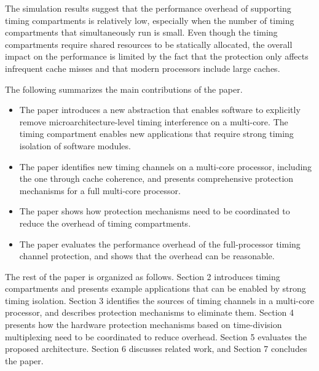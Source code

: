 
The simulation results suggest that the performance overhead of supporting
timing compartments is relatively low, especially when the number of timing
compartments that simultaneously run is small.
Even though
the timing compartments require shared resources to be statically 
allocated, the overall impact on the performance is limited by the fact
that the protection only affects infrequent cache misses and that modern
processors include large caches. 

The following summarizes the main contributions of the paper.

\begin{itemize}
\item The paper introduces a new abstraction that enables software to
explicitly remove microarchitecture-level timing interference on a multi-core.
The timing compartment enables new
applications that require strong timing isolation of software modules.
\item The paper identifies new timing channels on a multi-core processor,
including the one through cache coherence, and presents
comprehensive protection mechanisms for a full multi-core processor.
\item The paper shows how protection mechanisms need to be coordinated to
reduce the overhead of timing compartments.
\item The paper evaluates the performance overhead of the full-processor
timing channel protection, and shows that the overhead can be reasonable.
\end{itemize}

The rest of the paper is organized as follows.
Section 2 introduces timing compartments and 
presents example applications that can be enabled by strong timing isolation.
Section 3 identifies the sources of timing channels in a multi-core processor, and
describes protection mechanisms to eliminate them. 
Section 4 presents how the hardware protection mechanisms based on time-division
multiplexing need to be coordinated to reduce overhead.
Section 5 evaluates the proposed architecture. Section 6 discusses related
work, and Section 7 concludes the paper.
